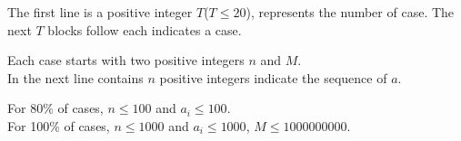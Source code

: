 The first line is a positive integer $T$($T \leq 20$), represents the number of case. The next $T$ blocks follow each indicates a case.

Each case starts with two positive integers $n$ and $M$.\\
In the next line contains $n$ positive integers indicate the sequence of $a$.

For 80\% of cases, $n \leq 100$ and $a_{i} \leq 100$.\\
For 100\% of cases, $n \leq 1000$ and $a_{i} \leq 1000$, $M \leq 1000000000$.